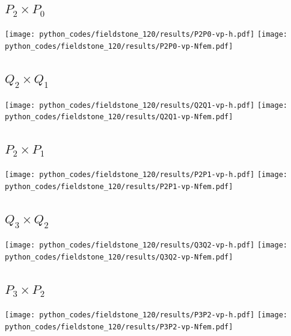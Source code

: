 \subsection*{$P_2\times P_0$}
\begin{center}
\texttt{[image: python\_codes/fieldstone\_120/results/P2P0-vp-h.pdf]}
\texttt{[image: python\_codes/fieldstone\_120/results/P2P0-vp-Nfem.pdf]}
\end{center}

\subsection*{$Q_2\times Q_1$}
\begin{center}
\texttt{[image: python\_codes/fieldstone\_120/results/Q2Q1-vp-h.pdf]}
\texttt{[image: python\_codes/fieldstone\_120/results/Q2Q1-vp-Nfem.pdf]}
\end{center}

\subsection*{$P_2\times P_1$}
\begin{center}
\texttt{[image: python\_codes/fieldstone\_120/results/P2P1-vp-h.pdf]}
\texttt{[image: python\_codes/fieldstone\_120/results/P2P1-vp-Nfem.pdf]}
\end{center}

\subsection*{$Q_3\times Q_2$}
\begin{center}
\texttt{[image: python\_codes/fieldstone\_120/results/Q3Q2-vp-h.pdf]}
\texttt{[image: python\_codes/fieldstone\_120/results/Q3Q2-vp-Nfem.pdf]}
\end{center}

\subsection*{$P_3\times P_2$}
\begin{center}
\texttt{[image: python\_codes/fieldstone\_120/results/P3P2-vp-h.pdf]}
\texttt{[image: python\_codes/fieldstone\_120/results/P3P2-vp-Nfem.pdf]}
\end{center}

\newpage
